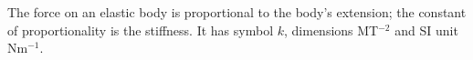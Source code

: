 The force on an elastic body is proportional to the body's 
extension; the constant of proportionality is the stiffness.
It has symbol $k$, dimensions MT$^{-2}$ and SI unit Nm$^{-1}$.